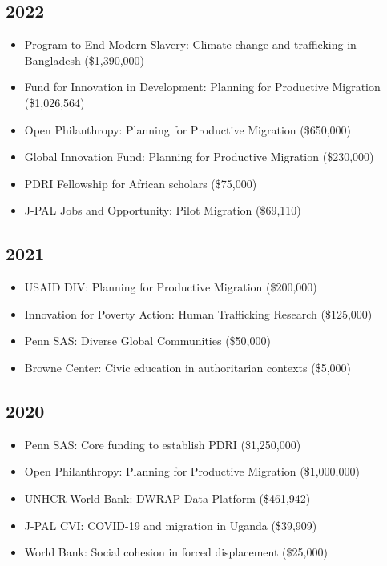 \documentclass[10pt,a4paper]{article}
\begin{document}
\subsection*{2022}
\begin{itemize}[leftmargin=1em, itemsep=1pt, topsep=2pt, label=\textcolor{secondary}{$\bullet$}]
\item Program to End Modern Slavery: Climate change and trafficking in Bangladesh (\$1,390,000)
\item Fund for Innovation in Development: Planning for Productive Migration (\$1,026,564)
\item Open Philanthropy: Planning for Productive Migration (\$650,000)
\item Global Innovation Fund: Planning for Productive Migration (\$230,000)
\item PDRI Fellowship for African scholars (\$75,000)
\item J-PAL Jobs and Opportunity: Pilot Migration (\$69,110)
\end{itemize}

\subsection*{2021}
\begin{itemize}[leftmargin=1em, itemsep=1pt, topsep=2pt, label=\textcolor{secondary}{$\bullet$}]
\item USAID DIV: Planning for Productive Migration (\$200,000)
\item Innovation for Poverty Action: Human Trafficking Research (\$125,000)
\item Penn SAS: Diverse Global Communities (\$50,000)
\item Browne Center: Civic education in authoritarian contexts (\$5,000)
\end{itemize}

\subsection*{2020}
\begin{itemize}[leftmargin=1em, itemsep=1pt, topsep=2pt, label=\textcolor{secondary}{$\bullet$}]
\item Penn SAS: Core funding to establish PDRI (\$1,250,000)
\item Open Philanthropy: Planning for Productive Migration (\$1,000,000)
\item UNHCR-World Bank: DWRAP Data Platform (\$461,942)
\item J-PAL CVI: COVID-19 and migration in Uganda (\$39,909)
\item World Bank: Social cohesion in forced displacement (\$25,000)
\end{itemize}
\end{document}

